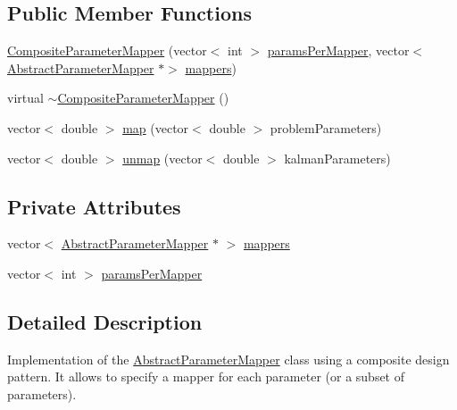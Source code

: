 \subsection*{Public Member Functions}
\begin{DoxyCompactItemize}
\item 
\mbox{\hyperlink{classCompositeParameterMapper_a449747544babe7240562d53944a4742c}{Composite\+Parameter\+Mapper}} (vector$<$ int $>$ \mbox{\hyperlink{classCompositeParameterMapper_ac39d00895ac754c09a81619aba5f644b}{params\+Per\+Mapper}}, vector$<$ \mbox{\hyperlink{classAbstractParameterMapper}{Abstract\+Parameter\+Mapper}} $\ast$$>$ \mbox{\hyperlink{classCompositeParameterMapper_a3f0668fba0502d95363d935ddf9fe9b4}{mappers}})
\item 
virtual \mbox{\hyperlink{classCompositeParameterMapper_a7905cc0fa03c261cb50d8443bb486764}{$\sim$\+Composite\+Parameter\+Mapper}} ()
\item 
vector$<$ double $>$ \mbox{\hyperlink{classCompositeParameterMapper_abac90f20835ad311cfdfc952956b9624}{map}} (vector$<$ double $>$ problem\+Parameters)
\item 
vector$<$ double $>$ \mbox{\hyperlink{classCompositeParameterMapper_a15d15009cf9026b22f27f5d8a5880a4e}{unmap}} (vector$<$ double $>$ kalman\+Parameters)
\end{DoxyCompactItemize}
\subsection*{Private Attributes}
\begin{DoxyCompactItemize}
\item 
vector$<$ \mbox{\hyperlink{classAbstractParameterMapper}{Abstract\+Parameter\+Mapper}} $\ast$ $>$ \mbox{\hyperlink{classCompositeParameterMapper_a3f0668fba0502d95363d935ddf9fe9b4}{mappers}}
\item 
vector$<$ int $>$ \mbox{\hyperlink{classCompositeParameterMapper_ac39d00895ac754c09a81619aba5f644b}{params\+Per\+Mapper}}
\end{DoxyCompactItemize}


\subsection{Detailed Description}
Implementation of the \mbox{\hyperlink{classAbstractParameterMapper}{Abstract\+Parameter\+Mapper}} class using a composite design pattern. It allows to specify a mapper for each parameter (or a subset of parameters). 


